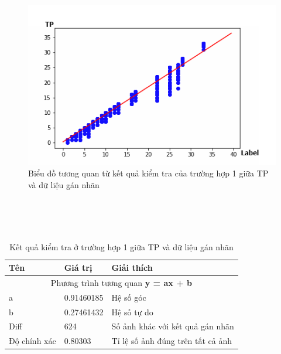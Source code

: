 \begin{center}
    \begin{figure}[htp]
    \centering
    \includegraphics[width=0.9\columnwidth]{images/chap3/correlation_tp_140k.png}
    \caption{Biểu đồ tương quan từ kết quả kiểm tra của trường hợp 1 giữa TP và dữ liệu gán nhãn}
    \label{fig:my_label}
    \end{figure}
\end{center}
~\\
~\\
~\\
\begin{table}[H]
    \begin{tabular}{p{4cm}  p{2.5cm}  p{5.5cm} }
    \hline		
	Tên & Giá trị & Giải thích \\
	\hline
	\multicolumn{3}{c}{Phương trình tương quan \textbf{y = ax + b}} \\
	a & 0.91460185 & Hệ số góc \\
	b & 0.27461432 & Hệ số tự do \\
	\hline
	
	Diff & 624 & Số ảnh khác với kết quả gán nhãn \\
	Độ chính xác & 0.80303 &  Tỉ lệ số ảnh đúng trên tất cả ảnh\\
	\hline
	\end{tabular}
	\caption{Kết quả kiểm tra ở trường hợp 1 giữa TP và dữ liệu gán nhãn}
    \label{chap3:case2:table02}    
\end{table}
